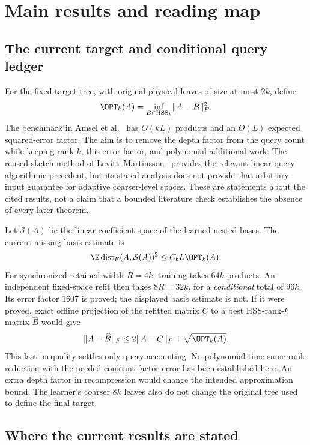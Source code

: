 \documentclass[11pt,oneside,openany,a4paper]{book}
\numberwithin{equation}{chapter}
\theoremstyle{definition}
\theoremstyle{remark}
\DeclareMathOperator{\HSS}{HSS}\DeclareMathOperator{\dist}{dist}
\begin{document}
\chapter*{Main results and reading map}

\section*{The current target and conditional query ledger}

For the fixed target tree, with original physical leaves of size at
most $2k$, define
\[
 \OPT_k(A)=\inf_{B\in\HSS_k}\lVert A-B\rVert_F^2.
\]
The benchmark in Amsel et al.\ \cite{AmselHSS} has $O(kL)$ products
and an $O(L)$ expected squared-error factor.  The aim is to remove the
depth factor from the query count while keeping rank $k$, this error
factor, and polynomial additional work.  The reused-sketch method of
Levitt--Martinsson\ \cite{LM} provides the relevant linear-query
algorithmic precedent, but its stated analysis does not provide that
arbitrary-input guarantee for adaptive coarser-level spaces.  These
are statements about the cited results, not a claim that a bounded
literature check establishes the absence of every later theorem.

Let $\mathcal S(A)$ be the linear coefficient space of the learned
nested bases.  The current missing basis estimate is
\[
 \E\operatorname{dist}_F(A,\mathcal S(A))^2
 \leq C_bL\OPT_k(A).
\]
For synchronized retained width $R=4k$, training takes $64k$ products.
An independent fixed-space refit then takes $8R=32k$, for a
\emph{conditional} total of $96k$.  Its error factor $1607$ is proved;
the displayed basis estimate is not.  If it were proved, exact offline
projection of the refitted matrix $C$ to a best HSS-rank-$k$ matrix
$\widehat B$ would give
\[
 \lVert A-\widehat B\rVert_F
 \leq2\lVert A-C\rVert_F+\sqrt{\OPT_k(A)}.
\]
This last inequality settles only query accounting.  No polynomial-time
same-rank reduction with the needed constant-factor error has been
established here.  An extra depth factor in recompression would change
the intended approximation bound.  The learner's coarser $8k$ leaves
also do not change the original tree used to define the final target.

\section*{Where the current results are stated}
\end{document}
